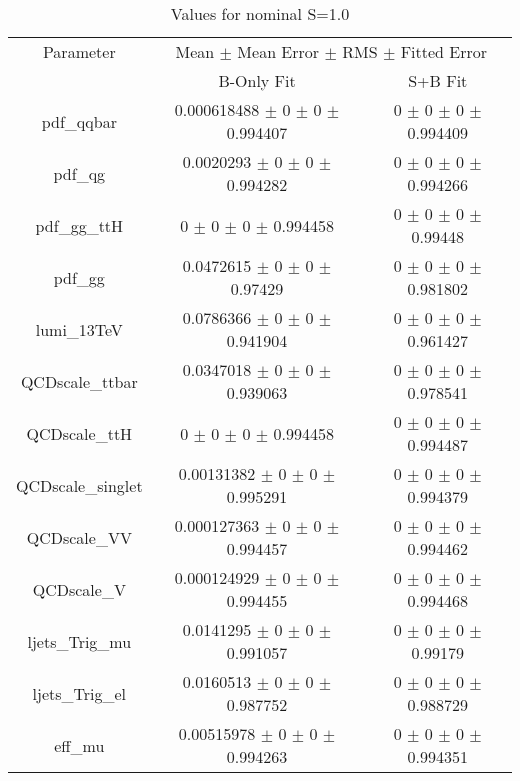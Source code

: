 \begin{table}
\centering
\caption{Values for nominal S=1.0}
\begin{tabular}{ccc}
\toprule
Parameter & \multicolumn{2}{c}{Mean $\pm$ Mean Error $\pm$ RMS $\pm$ Fitted Error}\\
 & B-Only Fit & S+B Fit\\
\midrule
pdf\_qqbar & \num{0.000618488} $\pm$ \num{0} $\pm$ \num{0} $\pm$ \num{0.994407} & \num{0} $\pm$ \num{0} $\pm$ \num{0} $\pm$ \num{0.994409}\\
pdf\_qg & \num{0.0020293} $\pm$ \num{0} $\pm$ \num{0} $\pm$ \num{0.994282} & \num{0} $\pm$ \num{0} $\pm$ \num{0} $\pm$ \num{0.994266}\\
pdf\_gg\_ttH & \num{0} $\pm$ \num{0} $\pm$ \num{0} $\pm$ \num{0.994458} & \num{0} $\pm$ \num{0} $\pm$ \num{0} $\pm$ \num{0.99448}\\
pdf\_gg & \num{0.0472615} $\pm$ \num{0} $\pm$ \num{0} $\pm$ \num{0.97429} & \num{0} $\pm$ \num{0} $\pm$ \num{0} $\pm$ \num{0.981802}\\
lumi\_13TeV & \num{0.0786366} $\pm$ \num{0} $\pm$ \num{0} $\pm$ \num{0.941904} & \num{0} $\pm$ \num{0} $\pm$ \num{0} $\pm$ \num{0.961427}\\
QCDscale\_ttbar & \num{0.0347018} $\pm$ \num{0} $\pm$ \num{0} $\pm$ \num{0.939063} & \num{0} $\pm$ \num{0} $\pm$ \num{0} $\pm$ \num{0.978541}\\
QCDscale\_ttH & \num{0} $\pm$ \num{0} $\pm$ \num{0} $\pm$ \num{0.994458} & \num{0} $\pm$ \num{0} $\pm$ \num{0} $\pm$ \num{0.994487}\\
QCDscale\_singlet & \num{0.00131382} $\pm$ \num{0} $\pm$ \num{0} $\pm$ \num{0.995291} & \num{0} $\pm$ \num{0} $\pm$ \num{0} $\pm$ \num{0.994379}\\
QCDscale\_VV & \num{0.000127363} $\pm$ \num{0} $\pm$ \num{0} $\pm$ \num{0.994457} & \num{0} $\pm$ \num{0} $\pm$ \num{0} $\pm$ \num{0.994462}\\
QCDscale\_V & \num{0.000124929} $\pm$ \num{0} $\pm$ \num{0} $\pm$ \num{0.994455} & \num{0} $\pm$ \num{0} $\pm$ \num{0} $\pm$ \num{0.994468}\\
ljets\_Trig\_mu & \num{0.0141295} $\pm$ \num{0} $\pm$ \num{0} $\pm$ \num{0.991057} & \num{0} $\pm$ \num{0} $\pm$ \num{0} $\pm$ \num{0.99179}\\
ljets\_Trig\_el & \num{0.0160513} $\pm$ \num{0} $\pm$ \num{0} $\pm$ \num{0.987752} & \num{0} $\pm$ \num{0} $\pm$ \num{0} $\pm$ \num{0.988729}\\
eff\_mu & \num{0.00515978} $\pm$ \num{0} $\pm$ \num{0} $\pm$ \num{0.994263} & \num{0} $\pm$ \num{0} $\pm$ \num{0} $\pm$ \num{0.994351}\\

\end{tabular}
\end{table}
